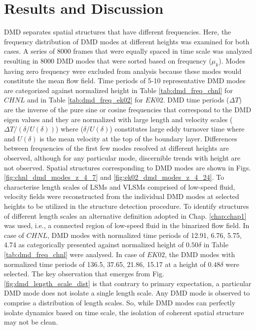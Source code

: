 \section{Results and Discussion}
DMD separates spatial structures that have different frequencies. Here, the frequency distribution of DMD modes at different heights was examined for both cases. A series of 8000 frames that were equally spaced in time scale was analyzed resulting in 8000 DMD modes that were sorted based on frequency ($\mu_k$). Modes having zero frequency were excluded from analysis because these modes would constitute the mean flow field. Time periods of 5-10 representative DMD modes are categorized against normalized height in Table \ref{tab:dmd_freq_chnl} for $CHNL$ and in Table \ref{tab:dmd_freq_ek02} for $EK02$. DMD time periods ($\Delta T$) are the inverse of the pure sine or cosine frequencies that correspond to the DMD eigen values and they are normalized with large length and velocity scales ($\Delta T / (\delta/U(\delta))$) where ($\delta/U(\delta)$) constitutes large eddy turnover time where and $U(\delta)$ is the mean velocity at the top of the boundary layer. Differences between frequencies of the first few modes resolved at different heights are observed, although for any particular mode,  discernible trends with height are not observed. Spatial structures corresponding to DMD modes are shown in Figs. \ref{fig:chnl_dmd_modes_z_4_7} and \ref{fig:ek02_dmd_modes_z_4_24}. To characterise length scales of LSMs and VLSMs comprised of low-speed fluid, velocity fields were reconstructed from the individual DMD modes at selected heights to be utilized in the structure detection procedure. To identify structures of different length scales an alternative definition adopted in Chap. \ref{chap:chap1} was used, i.e., a connected region of low-speed fluid in the binarized flow field. In case of $CHNL$, DMD modes with normalized time periods of 12.91, 6.76, 5.75, 4.74 as categorically presented against normalized height of $0.50\delta$ in Table \ref{tab:dmd_freq_chnl} were analysed.  In case of $EK02$, the DMD modes with normalized time periods of 136.5, 37.65, 21.86, 15.17 at a height of $0.48\delta$ were selected. The key observation that emerges from Fig. \ref{fig:dmd_length_scale_dist} is that contrary to primary expectation, a particular DMD mode does not isolate a single length scale. Any DMD mode is observed to comprise a distribution of length scales. So, while DMD modes can perfectly isolate dynamics based on time scale, the isolation of coherent spatial structure may not be clean. 

